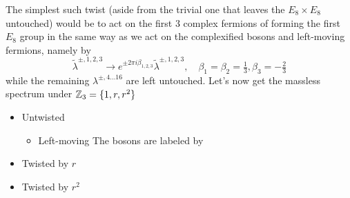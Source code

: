 \documentclass[11pt, class=article, crop=false]{standalone}
\begin{document}
\begin{enumerate}
	The simplest such twist (aside from the trivial one that leaves the $E_8 \times E_8$ untouched) would be to act on the first 3 complex fermions of forming the first $E_8$ group in the same way as we act on the complexified bosons and left-moving fermions, namely by
	\[
		\tilde \lambda^{\pm, 1,2,3} \to e^{\pm 2\pi i \beta_{1,2,3}} \tilde \lambda^{\pm, 1,2,3}, \quad \beta_1 = \beta_2 = \tfrac13, \beta_3 = -\tfrac23
	\]
	while the remaining $\lambda^{\pm, 4\dots 16}$ are left untouched. Let's now get the massless spectrum under $\mathbb{Z}_3 = \{1, r, r^2\}$
	\begin{itemize}
		\item Untwisted
		\begin{itemize}
			 \item Left-moving
			 The bosons are labeled by
		\end{itemize}
			
			
			
		
		\item Twisted by $r$
		
		\item Twisted by $r^2$
	\end{itemize}
	
\end{enumerate}

\end{document}
